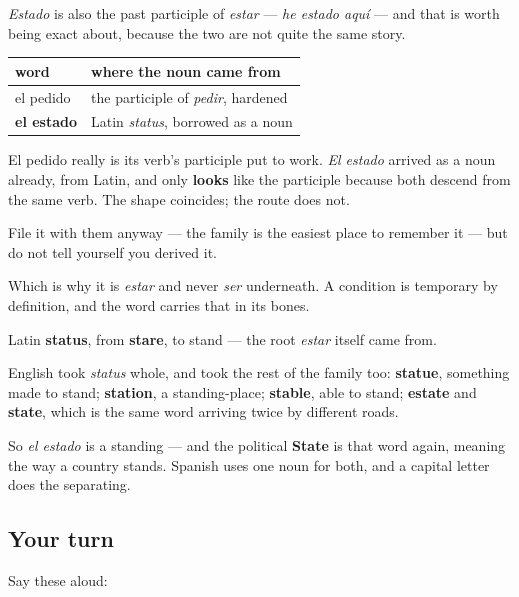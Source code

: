 \begin{grammarlens}[title={Grammar Lens: a participle hardened into a noun, again}]
\emph{Estado} is also the past participle of \emph{estar} — \emph{he estado aquí} — and that is worth being exact about, because the two are not quite the same story.

\noindent
\begin{tabularx}{\linewidth}{@{}>{\raggedright\arraybackslash}X>{\raggedright\arraybackslash}X@{}}
\toprule
\textbf{word} & \textbf{where the noun came from} \\
\midrule
el pedido & the participle of \emph{pedir}, hardened \\
\textbf{el estado} & Latin \emph{status}, borrowed as a noun \\
\bottomrule
\end{tabularx}

El pedido really is its verb's participle put to work. \emph{El estado} arrived as a noun already, from Latin, and only \textbf{looks} like the participle because both descend from the same verb. The shape coincides; the route does not.

File it with them anyway — the family is the easiest place to remember it — but do not tell yourself you derived it.

Which is why it is \emph{estar} and never \emph{ser} underneath. A condition is temporary by definition, and the word carries that in its bones.
\end{grammarlens}

\begin{cousinweb}
Latin \textbf{status}, from \textbf{stare}, to stand — the root \emph{estar} itself came from.

English took \emph{status} whole, and took the rest of the family too: \textbf{statue}, something made to stand; \textbf{station}, a standing-place; \textbf{stable}, able to stand; \textbf{estate} and \textbf{state}, which is the same word arriving twice by different roads.

So \emph{el estado} is a standing — and the political \textbf{State} is that word again, meaning the way a country stands. Spanish uses one noun for both, and a capital letter does the separating.
\end{cousinweb}

\subsection*{Your turn}
Say these aloud:

